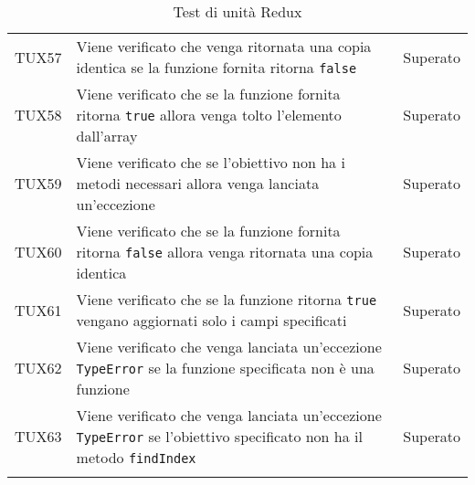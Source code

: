 \documentclass[PianoDiQualifica.tex]{subfiles}
\begin{document}
\begin{longtable}[H]{P{2cm}P{8.5cm}P{3cm}}
	TUX57 & Viene verificato che venga ritornata una copia identica se la funzione fornita ritorna \texttt{false} & Superato \\
	TUX58 & Viene verificato che se la funzione fornita ritorna \texttt{true} allora venga tolto l'elemento dall'array & Superato \\
	TUX59 & Viene verificato che se l'obiettivo non ha i metodi necessari allora venga lanciata un'eccezione & Superato \\
	TUX60 & Viene verificato che se la funzione fornita ritorna \texttt{false} allora venga ritornata una copia identica & Superato \\
	TUX61 & Viene verificato che se la funzione ritorna \texttt{true} vengano aggiornati solo i campi specificati & Superato \\
	TUX62 & Viene verificato che venga lanciata un'eccezione \texttt{TypeError} se la funzione specificata non è una funzione & Superato \\
	TUX63 & Viene verificato che venga lanciata un'eccezione \texttt{TypeError} se l'obiettivo specificato non ha il metodo \texttt{findIndex} & Superato \\
	\hiderowcolors
	\caption{Test di unità Redux}
\end{longtable}
\end{document}

